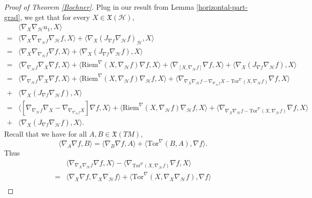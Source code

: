 \documentclass[10pt,a4paper]{amsart}
\newcommand{\Ho}{\mathcal H}
\newcommand{\Tor}{\mathrm{Tor}}
\begin{document}
	\begin{proof}[Proof of Theorem \ref{Bochner}]
		
		Plug in our result from Lemma \ref{horizontal-part-grad}, we get that for every $X \in \mathfrak{X}(\Ho)$,
		\begin{align*}
			&\langle \nabla_X \nabla_{\mathcal{H}}u_1 ,X \rangle\\
			=&\langle \nabla_X \nabla_{\nabla_\mathcal{H}f} \nabla_{\mathcal{H}}f, X \rangle+\langle \nabla_X (J_{\nabla f}\nabla_\mathcal{H}f)_{\mathcal{H}}, X \rangle\\
			=&\langle \nabla_X \nabla_{\nabla_\mathcal{H}f} \nabla f, X \rangle+\langle \nabla_X (J_{\nabla f}\nabla_\mathcal{H}f), X \rangle\\
			=&\langle \nabla_{\nabla_\mathcal{H}f} \nabla_X  \nabla f, X \rangle+\langle \mathrm{Riem}^{\nabla}(X, \nabla_{\mathcal{H}} f) \nabla f, X\rangle+{\langle \nabla_{[X, \nabla_\mathcal{H}f]}  \nabla f, X \rangle}+\langle \nabla_X (J_{\nabla f}\nabla_\mathcal{H}f), X \rangle\\
			=&\langle \nabla_{\nabla_\mathcal{H}f} \nabla_X  \nabla f, X \rangle+\langle \mathrm{Riem}^{\nabla}(X, \nabla_{\mathcal{H}} f) \nabla_\Ho f, X\rangle+{\langle \nabla_{\nabla_X \nabla_\mathcal{H}f-\nabla_{\nabla_\mathcal{H}f} X-\mathrm{Tor}^{\nabla}(X, \nabla_\mathcal{H}f) } \nabla f, X \rangle}\\
			+&\langle \nabla_X (J_{\nabla f}\nabla_\mathcal{H}f), X \rangle\\
			=&\langle[\nabla_{\nabla_\mathcal{H}f} \nabla_X-\nabla_{\nabla_{\nabla_\mathcal{H}f} X}] \nabla f, X \rangle+ \langle\mathrm{Riem}^{\nabla}(X, \nabla_{\mathcal{H}} f) \nabla_\Ho f, X\rangle+\langle \nabla_{\nabla_X \nabla_\mathcal{H}f-\Tor^{\nabla}(X, \nabla_\mathcal{H}f) } \nabla f, X \rangle\\
			+&\langle \nabla_X (J_{\nabla f}\nabla_\mathcal{H}f), X \rangle.
		\end{align*}
		Recall that we have for all $A,B\in \mathfrak{X}(TM)$,
		\[ \langle \nabla_A \nabla f, B \rangle=\langle \nabla_B \nabla f, A \rangle+\langle \Tor^\nabla(B,A), \nabla f \rangle.   \]
		Thus
		\begin{align*}
			&\langle \nabla_{\nabla_X \nabla_\mathcal{H}f} \nabla f, X \rangle-\langle \nabla_{\Tor^{\nabla}(X, \nabla_\mathcal{H}f) } \nabla f, X \rangle\\
			=&\langle \nabla_{X} \nabla f, \nabla_X \nabla_\mathcal{H}f  \rangle+\langle \Tor^{\nabla}(X, \nabla_X \nabla_\mathcal{H}f ), \nabla f \rangle\\

\end{align*}
\end{proof}
\end{document}
